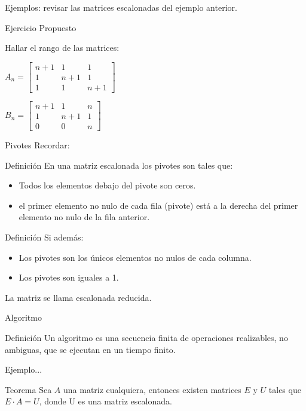Ejemplos: revisar las matrices escalonadas del ejemplo anterior.



{Ejercicio Propuesto}

Hallar el rango de las matrices:

$A_n=
\begin{bmatrix}
n+1  &  1       &  1\\
1       &  n+1  & 1\\
1       &   1     & n+1 
\end{bmatrix}
$

$B_n=
\begin{bmatrix}
n+1  &  1       &  n\\
1       &  n+1  & 1\\
0       &   0     & n 
\end{bmatrix}
$

{Pivotes}
Recordar:
\begin{block}{Definición}
En una matriz escalonada los pivotes son tales que:

\begin{itemize}
\item
Todos los elementos debajo del pivote son ceros.

\item
el primer elemento no nulo de cada fila (pivote) está a la derecha del primer elemento no nulo de la fila anterior.
\end{itemize}
\end{block}


\begin{block}{Definición}
Si además:

\begin{itemize}
\item
Los  pivotes son los únicos elementos no nulos de cada columna.

\item
Los pivotes son iguales a 1.
\end{itemize}

La matriz se llama escalonada reducida.
\end{block}


{Algoritmo}

\begin{block}{Definición}
Un algoritmo es una secuencia finita de operaciones realizables, no ambiguas, que se ejecutan en un tiempo finito.
\end{block}


Ejemplo...

\begin{block}{Teorema}
Sea $A$ una matriz cualquiera, entonces existen matrices $E$ y $U$ tales que $E\cdot A=U$, donde U es una matriz escalonada.
\end{block}

